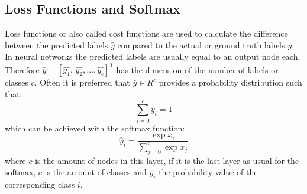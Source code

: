 \subsection{Loss Functions and Softmax}
Loss functions or also called cost functions are used to calculate the difference between the predicted labels $\hat{y}$ compared to the actual or ground truth labels $y$.
In neural networks the predicted labels are usually equal to an output node each.
Therefore $\hat{y} = [\hat{y_1}, \, \hat{y_2}, \dots, \hat{y_c}]^T$ has the dimension of the number of labels or classes $c$.
Often it is preferred that $\hat{y} \in R^c$ provides a probability distribution such that:
\begin{equation}
  \sum_{i=0}^c \hat{y}_i = 1
\end{equation}
which can be achieved with the softmax function:
\begin{equation}\label{eq:nn_theory_softmax}
  \hat{y}_i = \frac{\exp{x_i}}{\sum_{j=0}^{c}\exp{x_j}}
\end{equation}
where $c$ is the amount of nodes in this layer, if it is the last layer as usual for the softmax, $c$ is the amount of classes and $\hat{y}_i$ the probability value of the corresponding class $i$.

